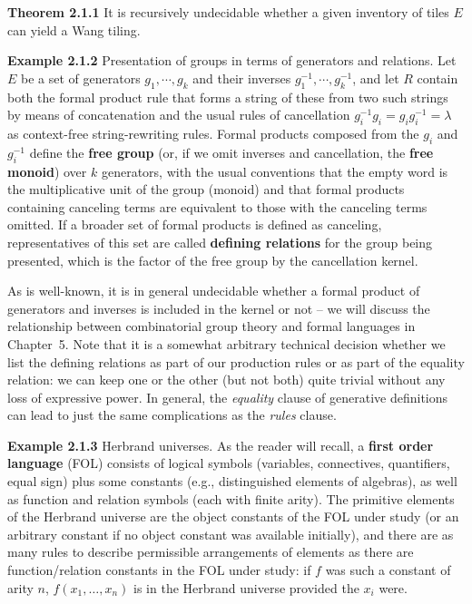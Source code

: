 \smallskip\noindent
{\bf Theorem 2.1.1} \cite{Berger:1966} It is recursively undecidable whether a
given inventory of tiles $E$ can yield a Wang tiling.

\smallskip\noindent
{\bf Example 2.1.2} Presentation of groups in terms of generators and
relations. Let $E$ be a set of generators $g_1,\cdots,g_k$ and their inverses
$g_1^{-1},\cdots,g_k^{-1}$, and let $R$ contain both the formal product rule
that forms a string of these from two such strings by means of concatenation
and the usual rules of cancellation $g_i^{-1}g_i=g_ig_i^{-1}=\lambda$ as
context-free string-rewriting rules. Formal products composed from the $g_i$
and $g_i^{-1}$ define the {\bf free group} (or, if we omit inverses and
cancellation, the {\bf free monoid}) over $k$ generators, with the usual
conventions that the empty word is the multiplicative unit of the group
(monoid) and that formal products containing canceling terms are equivalent to
those with the canceling terms omitted. If a broader set of formal products is
defined as canceling, representatives of this set are called {\bf defining
relations} for the group being presented, which is the factor of the free
group by the cancellation kernel. 

\smallskip{} As is well-known, it is in general
undecidable whether a formal product of generators and inverses is included in
the kernel or not \cite{Sims:1994} -- we will discuss the relationship between
combinatorial group theory and formal languages in Chapter~5. Note that it is
a somewhat arbitrary technical decision whether we list the defining relations
as part of our production rules or as part of the equality relation: we can
keep one or the other (but not both) quite trivial without any loss of
expressive power.  In general, the {\it equality} clause of generative
definitions can lead to just the same complications as the {\it rules} clause.

\smallskip\noindent
{\bf Example 2.1.3} Herbrand universes. As the reader will recall, a {\bf
first order language} (FOL) consists of logical symbols (variables,
connectives, quantifiers, equal sign) plus some constants (e.g., distinguished
elements of algebras), as well as function and relation symbols (each with
finite arity). The primitive elements of the Herbrand universe are the object
constants of the FOL under study (or an arbitrary constant if no object
constant was available initially), and there are as many rules to describe
permissible arrangements of elements as there are function/relation constants
in the FOL under study: if $f$ was such a constant of arity $n$,
$f(x_1,\ldots,x_n)$ is in the Herbrand universe provided the $x_i$ were.

